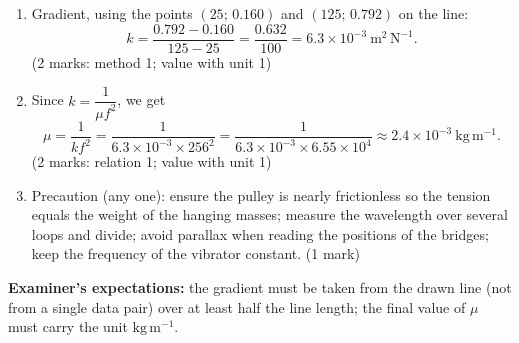\documentclass[11pt]{article}
\begin{document}
\begin{corrige}
\begin{enumerate}
\begin{center}
\end{center}
The points lie on a straight line through the origin, confirming $\lambda^2\propto T$. \hfill (4 marks: axes + scales 1; points 2; line through origin 1)
\item Gradient, using the points $(25;\,0.160)$ and $(125;\,0.792)$ on the line:
\[k=\frac{0.792-0.160}{125-25}=\frac{0.632}{100}=6.3\times10^{-3}\ \mathrm{m^2\,N^{-1}}.\]
\hfill (2 marks: method 1; value with unit 1)
\item Since $k=\dfrac{1}{\mu f^2}$, we get
\[\mu=\frac{1}{k f^2}=\frac{1}{6.3\times10^{-3}\times 256^2}=\frac{1}{6.3\times10^{-3}\times 6.55\times10^{4}}\approx 2.4\times10^{-3}\ \mathrm{kg\,m^{-1}}.\]
\hfill (2 marks: relation 1; value with unit 1)
\item Precaution (any one): ensure the pulley is nearly frictionless so the tension equals the weight of the hanging masses; measure the wavelength over several loops and divide; avoid parallax when reading the positions of the bridges; keep the frequency of the vibrator constant. \hfill (1 mark)
\end{enumerate}
\textbf{Examiner's expectations:} the gradient must be taken from the drawn line (not from a single data pair) over at least half the line length; the final value of $\mu$ must carry the unit $\mathrm{kg\,m^{-1}}$.
\end{corrige}
\end{document}
